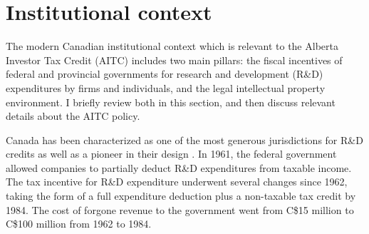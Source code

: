 \documentclass[../main.tex]{subfiles}
\begin{document}
\section{Institutional context}
\label{sec:institutional_background}

The modern Canadian institutional context which is relevant to the Alberta Investor Tax Credit (AITC) includes two main pillars: the fiscal incentives of federal and provincial governments for research and development (R\&D) expenditures by firms and individuals, and the legal intellectual property environment. I briefly review both in this section, and then discuss relevant details about the AITC policy.

Canada has been characterized as one of the most generous jurisdictions for R\&D credits \parencite{mckenzie08} as well as a pioneer in their design \parencite{mansfield_switzer85a}. In 1961, the federal government allowed companies to partially deduct R\&D expenditures from taxable income. The tax incentive for R\&D expenditure underwent several changes since 1962, taking the form of a full expenditure deduction plus a non-taxable tax credit by 1984. The cost of forgone revenue to the government went from C\$15 million to C\$100 million from 1962 to 1984. 
\end{document}
